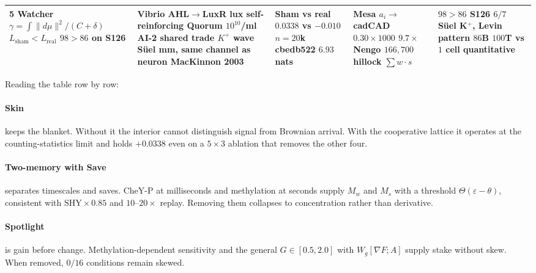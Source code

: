 \documentclass[12pt,a4paper]{article}
\begin{document}
\begin{table}[H]
\begin{tabular}{p{2.6cm} p{3.0cm} p{2.6cm} p{2.6cm} p{2.6cm}}
\midrule
5 Watcher \newline $\gamma = \int \lVert d\mu\rVert^2/(C+\delta)$ \newline $L_{\mathrm{sham}}<L_{\mathrm{real}}$ \newline $98{>}86$ on S126 &
Vibrio AHL$\to$LuxR lux self-reinforcing \newline Quorum $10^{10}$/ml \newline AI-2 shared trade \newline $K^+$ wave S\"{u}el mm, same channel as neuron \newline MacKinnon 2003 &
Sham vs real $0.0338$ vs $-0.010$ \newline $n=20$k cbedb522 \newline $6.93$ nats &
Mesa $a_i{\to}$cadCAD \newline $0.30{\times}1000$ $9.7{\times}$ \newline Nengo $166{,}700$ hillock $\sum w{\cdot}s$ &
$98{>}86$ S126 $6/7$ \newline S\"{u}el K$^+$, Levin pattern \newline $86$B $100$T vs $1$ cell quantitative \\
\bottomrule
\end{tabular}
\end{table}

Reading the table row by row:

\paragraph{Skin} keeps the blanket. Without it the interior cannot distinguish signal from Brownian arrival. With the cooperative lattice it operates at the counting-statistics limit and holds $+0.0338$ even on a $5{\times}3$ ablation that removes the other four.

\paragraph{Two-memory with Save} separates timescales and saves. CheY-P at milliseconds and methylation at seconds supply $M_w$ and $M_s$ with a threshold $\Theta(\varepsilon-\theta)$, consistent with $\mathrm{SHY}\times0.85$ and $10$--$20\times$ replay. Removing them collapses to concentration rather than derivative.

\paragraph{Spotlight} is gain before change. Methylation-dependent sensitivity and the general $G \in [0.5,2.0]$ with $W_g[\nabla F; A]$ supply stake without skew. When removed, $0/16$ conditions remain skewed.
\end{document}
